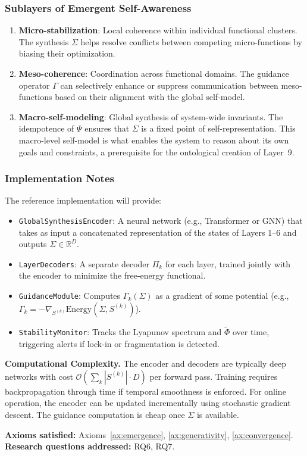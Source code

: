 \subsubsection{Sublayers of Emergent Self-Awareness}
\begin{enumerate}
    \item \textbf{Micro-stabilization}: Local coherence within individual functional clusters. The synthesis $\Sigma$ helps resolve conflicts between competing micro-functions by biasing their optimization.
    \item \textbf{Meso-coherence}: Coordination across functional domains. The guidance operator $\Gamma$ can selectively enhance or suppress communication between meso-functions based on their alignment with the global self-model.
    \item \textbf{Macro-self-modeling}: Global synthesis of system-wide invariants. The idempotence of $\Psi$ ensures that $\Sigma$ is a fixed point of self-representation. This macro-level self-model is what enables the system to reason about its own goals and constraints, a prerequisite for the ontological creation of Layer~9.
\end{enumerate}

\subsubsection{Implementation Notes}
The reference implementation will provide:
\begin{itemize}
    \item \texttt{GlobalSynthesisEncoder}: A neural network (e.g., Transformer or GNN) that takes as input a concatenated representation of the states of Layers 1--6 and outputs $\Sigma \in \mathbb{R}^D$.
    \item \texttt{LayerDecoders}: A separate decoder $\Pi_k$ for each layer, trained jointly with the encoder to minimize the free-energy functional.
    \item \texttt{GuidanceModule}: Computes $\Gamma_k(\Sigma)$ as a gradient of some potential (e.g., $\Gamma_k = -\nabla_{S^{(k)}} \text{Energy}(\Sigma, S^{(k)})$).
    \item \texttt{StabilityMonitor}: Tracks the Lyapunov spectrum and $\tilde{\Phi}$ over time, triggering alerts if lock-in or fragmentation is detected.
\end{itemize}

\textbf{Computational Complexity.} The encoder and decoders are typically deep networks with cost $\mathcal{O}(\sum_k |S^{(k)}| \cdot D)$ per forward pass. Training requires backpropagation through time if temporal smoothness is enforced. For online operation, the encoder can be updated incrementally using stochastic gradient descent. The guidance computation is cheap once $\Sigma$ is available.

\textbf{Axioms satisfied:} Axioms~\ref{ax:emergence}, \ref{ax:generativity}, \ref{ax:convergence}. \\
\textbf{Research questions addressed:} RQ6, RQ7.

\endinput